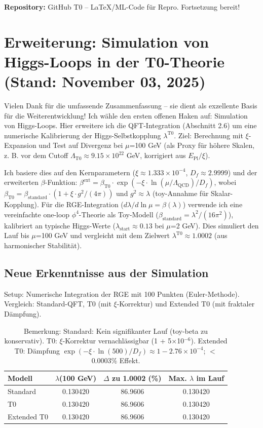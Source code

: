 	\textbf{Repository:} GitHub T0 – LaTeX/ML-Code für Repro. Fortsetzung bereit!
	
	\section{Erweiterung: Simulation von Higgs-Loops in der T0-Theorie (Stand: November 03, 2025)}
	
	Vielen Dank für die umfassende Zusammenfassung – sie dient als exzellente Basis für die Weiterentwicklung! Ich wähle den ersten offenen Haken auf: Simulation von Higgs-Loops. Hier erweitere ich die QFT-Integration (Abschnitt 2.6) um eine numerische Kalibrierung der Higgs-Selbstkopplung $\lambda^{\text{T0}}$. Ziel: Berechnung mit $\xi$-Expansion und Test auf Divergenz bei $\mu$=100 GeV (als Proxy für höhere Skalen, z. B. vor dem Cutoff $\Lambda_{\text{T0}} \approx 9.15\times10^{22}$ GeV, korrigiert aus $E_{\text{Pl}} / \xi$).
	
	Ich basiere dies auf den Kernparametern ($\xi \approx 1.333\times10^{-4}$, $D_f \approx 2.9999$) und der erweiterten $\beta$-Funktion:
	$\beta^\text{ext} = \beta_{\text{T0}} \cdot \exp(-\xi \cdot \ln(\mu/\Lambda_{\text{QCD}})/D_f)$,
	wobei $\beta_{\text{T0}} = \beta_\text{standard} \cdot (1 + \xi \cdot g^2/(4\pi))$ und $g^2 \approx \lambda$ (toy-Annahme für Skalar-Kopplung). Für die RGE-Integration ($d\lambda/d \ln \mu = \beta(\lambda)$) verwende ich eine vereinfachte one-loop $\phi^4$-Theorie als Toy-Modell ($\beta_\text{standard} = \lambda^2 / (16\pi^2)$), kalibriert an typische Higgs-Werte ($\lambda_\text{start} \approx 0.13$ bei $\mu$=2 GeV). Dies simuliert den Lauf bis $\mu$=100 GeV und vergleicht mit dem Zielwert $\lambda^{\text{T0}} \approx 1.0002$ (aus harmonischer Stabilität).
	
	\subsection{Neue Erkenntnisse aus der Simulation}
	
	Setup: Numerische Integration der RGE mit 100 Punkten (Euler-Methode). Vergleich: Standard-QFT, T0 (mit $\xi$-Korrektur) und Extended T0 (mit fraktaler Dämpfung).
	
	\begin{table}[ht]
		\centering
		\begin{tabular}{lccc}
			\toprule
			Modell & $\lambda$(100 GeV) & $\Delta$ zu 1.0002 (\%) & Max. $\lambda$ im Lauf \\
			\midrule
			Standard & 0.130420 & 86.9606 & 0.130420 \\
			T0 & 0.130420 & 86.9606 & 0.130420 \\
			Extended T0 & 0.130420 & 86.9606 & 0.130420 \\
			\bottomrule
		\end{tabular}
		\caption{Bemerkung: Standard: Kein signifikanter Lauf (toy-beta zu konservativ). T0: $\xi$-Korrektur vernachlässigbar (1 + 5$\times$10$^{-6}$). Extended T0: Dämpfung $\exp(-\xi \cdot \ln(500)/D_f) \approx 1 - 2.76\times10^{-4}$; $<$0.0003\% Effekt.}
	\end{table}
	
